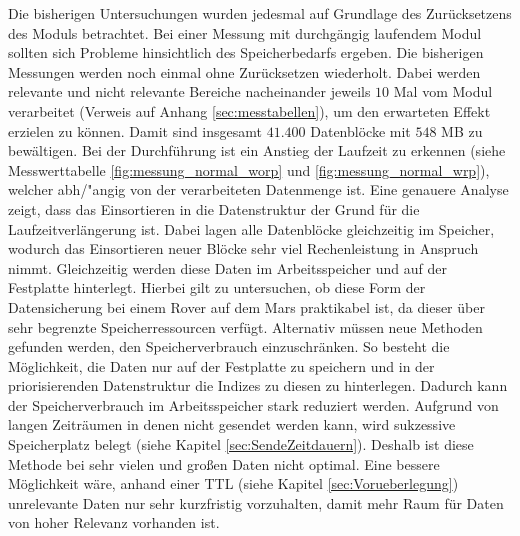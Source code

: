 Die bisherigen Untersuchungen wurden jedesmal auf Grundlage des Zurücksetzens
des Moduls betrachtet. Bei einer Messung mit durchgängig laufendem Modul sollten
sich Probleme hinsichtlich des Speicherbedarfs ergeben.
\newline
Die bisherigen Messungen werden noch einmal ohne Zurücksetzen wiederholt. Dabei
werden relevante und nicht relevante Bereiche nacheinander jeweils $10$ Mal vom
Modul verarbeitet (Verweis auf Anhang \ref{sec:messtabellen}), um den
erwarteten Effekt erzielen zu können. Damit sind insgesamt $41.400$ Datenblöcke
mit $548$ MB zu bewältigen. 
\newline
Bei der Durchführung ist ein Anstieg der Laufzeit zu erkennen (siehe
Messwerttabelle \ref{fig:messung_normal_worp} und \ref{fig:messung_normal_wrp}),
welcher abh{/"a}ngig von der verarbeiteten Datenmenge ist. Eine genauere Analyse
zeigt, dass das Einsortieren in die Datenstruktur  der Grund für die
Laufzeitverlängerung ist.
Dabei lagen alle Datenblöcke gleichzeitig im Speicher, wodurch das
Einsortieren neuer Blöcke sehr viel Rechenleistung in Anspruch nimmt.
Gleichzeitig werden diese Daten im Arbeitsspeicher und auf der Festplatte
hinterlegt. Hierbei gilt zu untersuchen, ob diese Form der Datensicherung bei
einem Rover auf dem Mars praktikabel ist, da dieser über sehr begrenzte
Speicherressourcen verfügt. \newline
Alternativ müssen neue Methoden gefunden werden, den
Speicherverbrauch einzuschränken. So besteht die Möglichkeit, die Daten nur auf
der Festplatte zu speichern und in der priorisierenden Datenstruktur die Indizes
zu diesen zu hinterlegen. Dadurch kann der Speicherverbrauch im Arbeitsspeicher
stark reduziert werden. Aufgrund von langen Zeiträumen in denen nicht gesendet
werden kann, wird sukzessive Speicherplatz belegt (siehe Kapitel \ref{sec:SendeZeitdauern}).
Deshalb ist diese Methode bei sehr vielen und großen Daten nicht optimal. Eine
bessere Möglichkeit wäre, anhand einer \gls{TTL} (siehe Kapitel
\ref{sec:Vorueberlegung}) unrelevante Daten nur sehr kurzfristig vorzuhalten,
damit mehr Raum für Daten von hoher Relevanz vorhanden ist.
